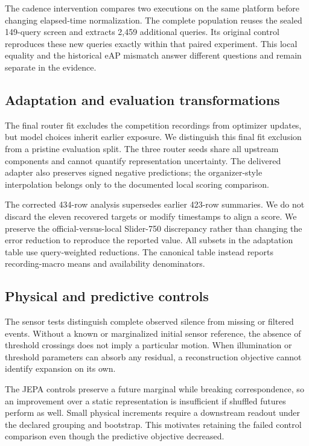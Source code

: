 \documentclass[twocolumn,letterpaper]{article}
\begin{document}
The cadence intervention compares two executions on the same platform before changing elapsed-time normalization. The complete population reuses the sealed 149-query screen and extracts 2,459 additional queries. Its original control reproduces these new queries exactly within that paired experiment. This local equality and the historical eAP mismatch answer different questions and remain separate in the evidence.

\subsection{Adaptation and evaluation transformations}
The final router fit excludes the competition recordings from optimizer updates, but model choices inherit earlier exposure. We distinguish this final fit exclusion from a pristine evaluation split. The three router seeds share all upstream components and cannot quantify representation uncertainty. The delivered adapter also preserves signed negative predictions; the organizer-style interpolation belongs only to the documented local scoring comparison.

The corrected 434-row analysis supersedes earlier 423-row summaries. We do not discard the eleven recovered targets or modify timestamps to align a score. We preserve the official-versus-local Slider-750 discrepancy rather than changing the error reduction to reproduce the reported value. All subsets in the adaptation table use query-weighted reductions. The canonical table instead reports recording-macro means and availability denominators.

\subsection{Physical and predictive controls}
The sensor tests distinguish complete observed silence from missing or filtered events. Without a known or marginalized initial sensor reference, the absence of threshold crossings does not imply a particular motion. When illumination or threshold parameters can absorb any residual, a reconstruction objective cannot identify expansion on its own.

The JEPA controls preserve a future marginal while breaking correspondence, so an improvement over a static representation is insufficient if shuffled futures perform as well. Small physical increments require a downstream readout under the declared grouping and bootstrap. This motivates retaining the failed control comparison even though the predictive objective decreased.
\end{document}
